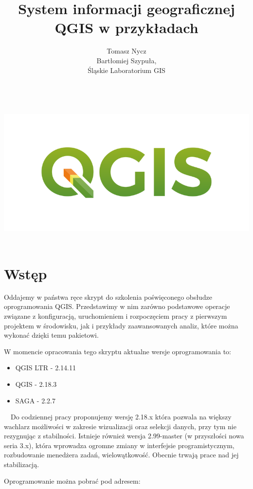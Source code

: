 \documentclass[12pt,a4paper]{book}
\begin{document}
\frontmatter
\includegraphics[width=15.949cm,height=7.645cm]{logo-qgis3}	
\title{System informacji geograficznej \Huge{QGIS} w przykładach}
\author{Tomasz Nycz \\Bartłomiej Szypuła, \\Śląskie Laboratorium GIS}
\date{}
\maketitle


\chapter{Wstęp}
Oddajemy w państwa ręce skrypt do szkolenia poświęconego obsłudze oprogramowania QGIS. Przedstawimy w nim zarówno podstawowe operacje związane z konfiguracją, uruchomieniem i rozpoczęciem pracy z pierwszym projektem w środowisku, jak i przykłady zaawansowanych analiz, które można wykonać dzięki temu pakietowi.

W momencie opracowania tego skryptu aktualne wersje oprogramowania to:
\begin{itemize}
\item QGIS LTR - 2.14.11
\item QGIS - 2.18.3
\item SAGA - 2.2.7
\end{itemize}
\ \ Do codziennej pracy proponujemy wersję 2.18.x która pozwala na większy wachlarz możliwości w zakresie wizualizacji oraz selekcji danych, przy tym nie rezygnując z stabilności. Istnieje również wersja 2.99-master (w przyszłości nowa seria 3.x), która wprowadza ogromne zmiany w interfejsie programistycznym, rozbudowanie menedżera zadań, wielowątkowość. Obecnie trwają prace nad jej stabilizacją.

Oprogramowanie można pobrać pod adresem:
\end{document}

